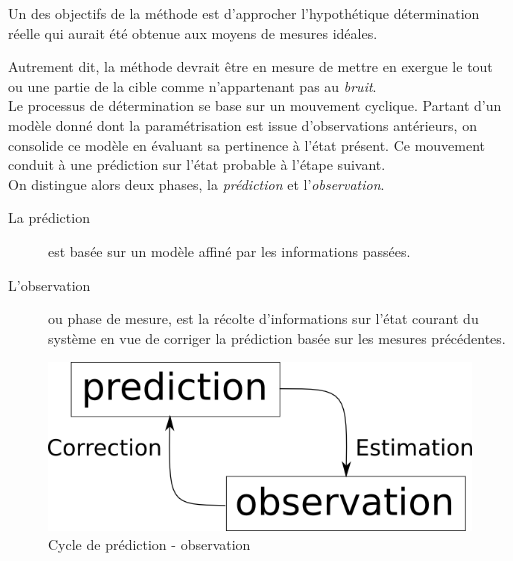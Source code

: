 \documentclass[a4paper,12pt]{report}
\begin{document}
Un des objectifs de la méthode est d'approcher l'hypothétique détermination réelle qui aurait été obtenue aux moyens de mesures idéales. 

Autrement dit, la méthode devrait être en mesure de mettre en exergue le tout ou une partie de la cible comme n'appartenant pas au \emph{bruit}.\\

Le processus de détermination se base sur un mouvement cyclique. Partant d'un modèle donné dont la paramétrisation est issue d'observations antérieurs, on consolide ce modèle en évaluant sa pertinence à l'état présent. Ce mouvement conduit à une prédiction sur l'état probable à l'étape suivant.\\ 
On distingue alors deux phases, la \textit{prédiction} et l'\textit{observation}. 
\begin{description}
\item [La prédiction] est basée sur un modèle affiné par les informations passées.
\item [L'observation] ou phase de mesure, est la récolte d'informations sur l'état courant du système en vue de corriger la prédiction basée sur les mesures précédentes.\\
\end{description}
 
\begin{figure}[H]

\includegraphics[scale=0.5]{figurePredictionObservationCycle.png}
\centering
\caption{Cycle de prédiction - observation}
\end{figure}
\end{document}
